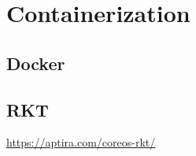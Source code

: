 \section{Containerization}


\subsection{Docker}

\subsection{RKT}
\url{https://aptira.com/coreos-rkt/}